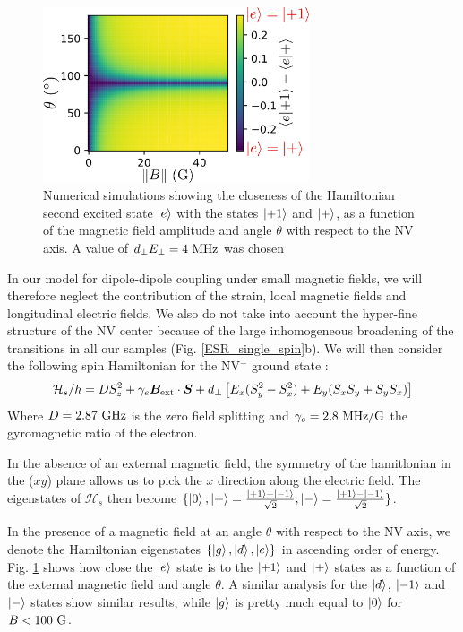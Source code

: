 \documentclass[preprintnumbers,amsmath,amssymb,onecolumn,12pt]{revtex4-2}\usepackage{graphicx}%
\begin{document}
\begin{figure}[h]
\includegraphics[width=0.7\textwidth]{Figures_SI/map_etats_propres}
\caption{Numerical simulations showing the closeness of the Hamiltonian second excited state $\ket{e}$ with the states $\ket{+1}$ and $\ket{+}$, as a function of the magnetic field amplitude and angle $\theta$ with respect to the NV axis. A value of $d_\perp E_\perp = 4\ \rm MHz$ was chosen}
\label{map etats propres}
\end{figure}

In our model for  dipole-dipole coupling under small magnetic fields, we will therefore neglect the contribution of the strain, local magnetic fields and longitudinal electric fields.  We also do not take into account the hyper-fine structure of the NV center because of the large inhomogeneous broadening of the transitions in all our samples (Fig. \ref{ESR_single_spin}b).
We will then consider the following spin Hamiltonian for the NV$^-$ ground state : 
\begin{equation}
\label{NV Hamiltonian}
\mathcal{H}_s/h=D S_z^2 + \gamma_e \bm{B}_{\rm ext} \cdot \bm{S}+ d_\perp \left[ E_x(S_y^2-S_x^2) + E_y(S_xS_y+S_yS_x) \right]
\end{equation}
Where $D=2.87\ \rm GHz$ is the zero field splitting and $\gamma_e=2.8\ \rm MHz/G$ the gyromagnetic ratio of the electron.

In the absence of an external magnetic field, the symmetry of the hamitlonian in the ($xy$) plane allows us to pick the $x$ direction along the electric field. The eigenstates of $\mathcal{H}_s$ then become $\{ \ket{0},\ket{+}=\frac{\ket{+1}+\ket{-1}}{\sqrt{2}},\ket{-}=\frac{\ket{+1}-\ket{-1}}{\sqrt{2}} \} $.

In the presence of a magnetic field at an angle $\theta$ with respect to the NV axis, we denote the Hamiltonian eigenstates $\{ \ket{g},\ket{d}, \ket{e} \} $ in ascending order of energy. Fig. \ref{map etats propres} shows how close the $\ket{e}$ state is to the $\ket{+1}$ and $\ket{+}$ states as a function of the external magnetic field and angle $\theta$. A similar analysis for the  $\ket{d}$, $\ket{-1}$ and $\ket{-}$ states show similar results, while $\ket{g}$ is pretty much equal to $\ket{0}$ for $B<100\ \rm G$.
\end{document}
